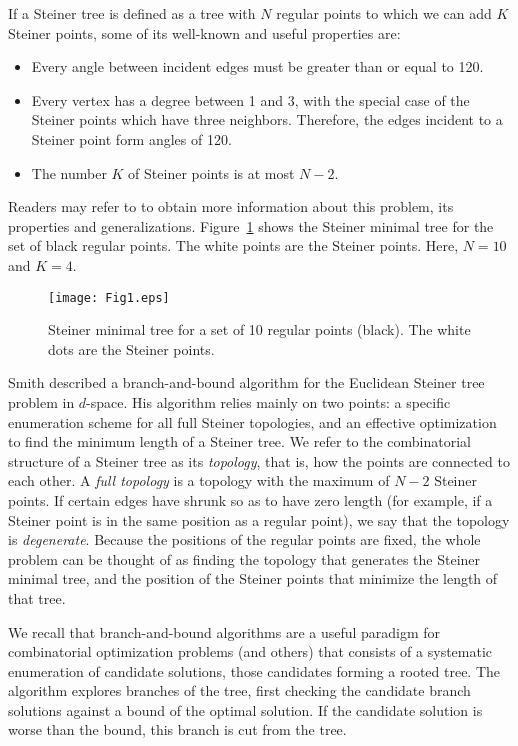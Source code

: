 \documentclass{article}
\theoremstyle{plain}
\begin{document}
If a Steiner tree is defined as a tree with $N$ regular points to which we can add $K$ Steiner points, some of its well-known and useful properties \cite{Gilbert} are:
\begin{itemize}
\item{Every angle between incident edges must be greater than or equal to 120\degree.}
\item{Every vertex has a degree between 1 and 3, with the special case of the Steiner points which have three neighbors. Therefore, the edges incident to a Steiner point form angles of 120\degree. }
\item{The number $K$ of Steiner points is at most $N - 2$.}
\end{itemize} 
Readers may refer to \cite{ref4} to obtain more information about this problem, its properties and generalizations. Figure~\ref{Fig1} shows the Steiner minimal tree for the set of black regular points. The white points are the Steiner points. Here, $N=10$ and $K=4$. 

\begin{figure}
\centering
\texttt{[image: Fig1.eps]}
\caption{Steiner minimal tree for a set of 10 regular points (black). The white dots are the Steiner points\label{Fig1}.}
\end{figure}


Smith \cite{Smith} described a \mbox{branch-and-bound} algorithm for the Euclidean Steiner tree problem in $d$-space. His algorithm relies mainly on two points: a specific enumeration scheme for all full Steiner topologies, and an effective optimization to find the minimum length of a Steiner tree. We refer to the combinatorial structure of a Steiner tree as its \emph{topology}, that is, how the points are connected to each other. 
A \emph{full topology} is a topology with the maximum of $N - 2$ Steiner points. If certain edges have shrunk so as to have zero length (for example, if a Steiner point is in the same position as a regular point), we say that the topology is \emph{degenerate}.
Because the positions of the regular points are fixed, the whole problem can be thought of as finding the topology that generates the Steiner minimal tree, and the position of the Steiner points that minimize the length of that tree.

We recall that \mbox{branch-and-bound} algorithms are a useful paradigm for combinatorial optimization problems (and others) that consists of a systematic enumeration of candidate solutions, those candidates forming a rooted tree. 
The algorithm explores branches of the tree, first checking the candidate branch solutions against a bound of the optimal solution. 
If the candidate solution is worse than the bound, this branch is cut from the tree. 
\end{document}
